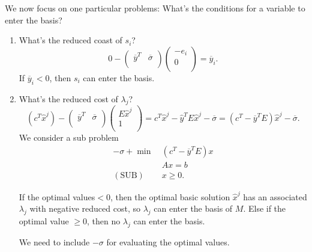 \begin{prev}
	We now focus on one particular problems: What's the conditions for a variable to enter the basis?
	\begin{enumerate}
		\item What's the reduced coast of \(s_{i}\)?
		      \[
			      0 - \begin{pmatrix}
				      \overline{y}^{T} & \overline{\sigma} \\
			      \end{pmatrix}\begin{pmatrix}
				      -e_{i} \\
				      0      \\
			      \end{pmatrix} = \overline{y}_i.
		      \]
		      If \(\overline{y}_i<0\), then \(s_{i}\) can enter the basis.
		\item What's the reduced cost of \(\lambda_{j}\)?
		      \[
			      (c^{T}\hat{x}^j) - \begin{pmatrix}
				      \overline{y}^{T} & \overline{\sigma} \\
			      \end{pmatrix}\begin{pmatrix}
				      E\hat{x}^j \\
				      1          \\
			      \end{pmatrix} = c^{T}\hat{x}^j - \hat{y}^{T}E\hat{x}^j - \overline{\sigma} = (c^{T} - \overline{y}^{T}E)\hat{x}^j - \overline{\sigma}.
		      \]
		      We consider a sub problem
		      \begin{align*}
			      -\sigma + \min~     & (c^{T} - \overline{y}^{T}E)x \\
			                          & Ax = b                       \\
			      (\mathrm{SUB})\quad & x\geq 0.
		      \end{align*}

		      If the optimal values\(<0\), then the optimal basic solution \(\hat{x}^j\) has an associated \(\lambda_{j}\) with negative reduced cost, so \(\lambda_{j}\) can
		      enter the basis  of \(M\). Else if the optimal value \(\geq 0\), then no \(\lambda_{j}\) can enter the basis.

		      \begin{note}
			      We need to include \(-\sigma\) for evaluating the optimal values.
		      \end{note}


\end{enumerate}
\end{prev}
